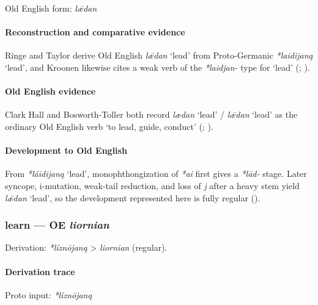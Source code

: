 \documentclass[
  british,
  a4paper,
]{article}
\providecommand{\Recon}[1]{\emph{*#1}}
\begin{document}
Old English form: \emph{lǣdan}

\paragraph{Reconstruction and comparative
evidence}\label{reconstruction-and-comparative-evidence-36}

Ringe and Taylor derive Old English \emph{lǣdan} `lead' from
Proto-Germanic \Recon{laidijaną} `lead', and Kroonen likewise cites a
weak verb of the \emph{*laidjan-} type for `lead'
(;
).

\paragraph{Old English evidence}\label{old-english-evidence-36}

Clark Hall and Bosworth-Toller both record \emph{lædan} `lead' /
\emph{lǣdan} `lead' as the ordinary Old English verb `to lead, guide,
conduct' (;
).

\paragraph{Development to Old
English}\label{development-to-old-english-36}

From \Recon{láidijaną} `lead', monophthongization of \emph{*ai} first
gives a \emph{*lād-} stage. Later syncope, i-mutation, weak-tail
reduction, and loss of \emph{j} after a heavy stem yield \emph{lǣdan}
`lead', so the development represented here is fully regular
().

\subsubsection{\texorpdfstring{learn --- OE
\emph{liornian}}{learn --- OE liornian}}\label{learn-oe-liornian}

Derivation: \emph{*líznōjaną} \textgreater{} \emph{liornian} (regular).

\paragraph{Derivation trace}\label{derivation-trace-41}

Proto input: \emph{*líznōjaną}
\end{document}
